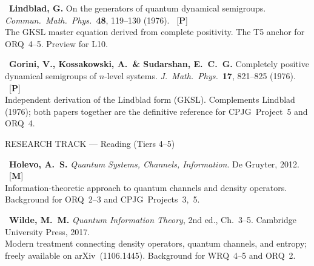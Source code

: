 \documentclass[11pt,a4paper]{article}
\begin{document}
\begin{enumerate}[leftmargin=2em,label={\textbf{[\arabic*]}},itemsep=6pt,resume]
  \item {}\
    \textbf{Lindblad, G.}
    On the generators of quantum dynamical semigroups.
    \textit{Commun.\ Math.\ Phys.}~\textbf{48}, 119--130 (1976). \essential\ [\textbf{P}]\\
    The GKSL master equation derived from complete positivity.
    The T5 anchor for ORQ~4--5. Preview for L10.

  \item {}\
    \textbf{Gorini, V., Kossakowski, A.\ \& Sudarshan, E.~C.~G.}
    Completely positive dynamical semigroups of $n$-level systems.
    \textit{J.\ Math.\ Phys.}~\textbf{17}, 821--825 (1976). \essential\ [\textbf{P}]\\
    Independent derivation of the Lindblad form (GKSL).
    Complements Lindblad (1976); both papers together are the definitive
    reference for CPJG~Project~5 and ORQ~4.

\end{enumerate}

\bigskip
\begin{tcolorbox}[trackheaderRES]
RESEARCH TRACK --- Reading (Tiers 4--5)
\end{tcolorbox}

\bigskip
\begin{enumerate}[leftmargin=2em,label={\textbf{[\arabic*]}},itemsep=6pt,resume]

  \item \tiertag{tier5col}{T5}\
    \textbf{Holevo, A.~S.}
    \textit{Quantum Systems, Channels, Information}.
    De Gruyter, 2012. \recommended\ [\textbf{M}]\\
    Information-theoretic approach to quantum channels and density operators.
    Background for ORQ~2--3 and CPJG~Projects~3,~5.

  \item \tiertag{tier5col}{T5}\
    \textbf{Wilde, M.~M.}
    \textit{Quantum Information Theory}, 2nd ed., Ch.~3--5.
    Cambridge University Press, 2017. \recommended\\
    Modern treatment connecting density operators, quantum channels, and
    entropy; freely available on arXiv~(1106.1445). Background for WRQ~4--5
    and ORQ~2.

\end{enumerate}
\end{document}
